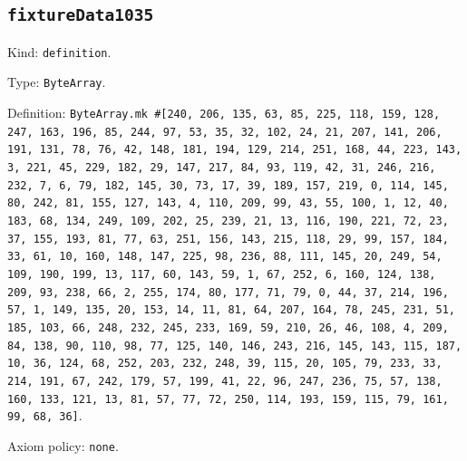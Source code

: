 \documentclass[11pt]{article}
\begin{document}
\subsection*{\texttt{fixtureData1035}}
\noindent Kind: \texttt{definition}.\par
\noindent Type: \texttt{ByteArray}.\par
\noindent Definition: \texttt{ByteArray.mk \#[240, 206, 135, 63, 85, 225, 118, 159, 128, 247, 163, 196, 85, 244, 97, 53, 35, 32, 102, 24, 21, 207, 141, 206, 191, 131, 78, 76, 42, 148, 181, 194, 129, 214, 251, 168, 44, 223, 143, 3, 221, 45, 229, 182, 29, 147, 217, 84, 93, 119, 42, 31, 246, 216, 232, 7, 6, 79, 182, 145, 30, 73, 17, 39, 189, 157, 219, 0, 114, 145, 80, 242, 81, 155, 127, 143, 4, 110, 209, 99, 43, 55, 100, 1, 12, 40, 183, 68, 134, 249, 109, 202, 25, 239, 21, 13, 116, 190, 221, 72, 23, 37, 155, 193, 81, 77, 63, 251, 156, 143, 215, 118, 29, 99, 157, 184, 33, 61, 10, 160, 148, 147, 225, 98, 236, 88, 111, 145, 20, 249, 54, 109, 190, 199, 13, 117, 60, 143, 59, 1, 67, 252, 6, 160, 124, 138, 209, 93, 238, 66, 2, 255, 174, 80, 177, 71, 79, 0, 44, 37, 214, 196, 57, 1, 149, 135, 20, 153, 14, 11, 81, 64, 207, 164, 78, 245, 231, 51, 185, 103, 66, 248, 232, 245, 233, 169, 59, 210, 26, 46, 108, 4, 209, 84, 138, 90, 110, 98, 77, 125, 140, 146, 243, 216, 145, 143, 115, 187, 10, 36, 124, 68, 252, 203, 232, 248, 39, 115, 20, 105, 79, 233, 33, 214, 191, 67, 242, 179, 57, 199, 41, 22, 96, 247, 236, 75, 57, 138, 160, 133, 121, 13, 81, 57, 77, 72, 250, 114, 193, 159, 115, 79, 161, 99, 68, 36]}.\par
\noindent Axiom policy: \texttt{none}.\par
\end{document}
